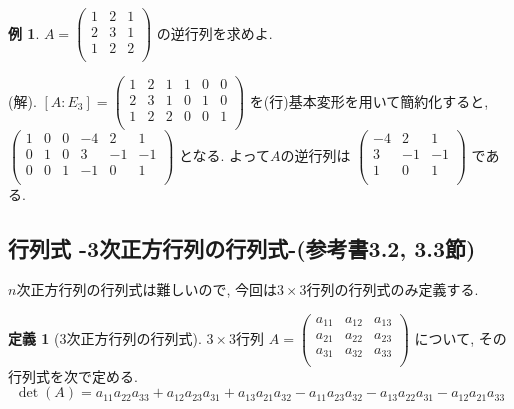 \documentclass[dvipdfmx,a4paper,11pt]{article}
\theoremstyle{definition}
\newtheorem{dfn}[thm]{定義}
\newtheorem{exa}[thm]{例}
\begin{document}
 \begin{exa}
 $
  A=\begin{pmatrix}
 1& 2&1 \\
 2& 3 & 1 \\
 1& 2 &  2 \\
 \end{pmatrix} 
 $
 の逆行列を求めよ.
 
 (解).
 $[A:E_3] = 
 \begin{pmatrix}
 1& 2&1  &1& 0&0 \\
 2& 3 & 1 &0& 1&0 \\
 1& 2 &  2 &0& 0&1 \\
 \end{pmatrix} 
 $
 を(行)基本変形を用いて簡約化すると, \\
 $
 \begin{pmatrix}
 1& 0&0  &-4& 2&1 \\
 0& 1 & 0 &3& -1&-1 \\
 0& 0&  1 &-1& 0&1 \\
 \end{pmatrix} 
 $
 となる. よって$A$の逆行列は
 $
 \begin{pmatrix}
-4& 2&1 \\
3& -1&-1\\
1& 0&1 \\
 \end{pmatrix} 
 $
 である.
 \end{exa}


 \subsection{行列式 -3次正方行列の行列式-(参考書3.2, 3.3節)}
 \label{subsec-7-2}
$n$次正方行列の行列式は難しいので, 今回は$3 \times 3$行列の行列式のみ定義する.

 \begin{tcolorbox}[
    colback = white,
    colframe = green!35!black,
    fonttitle = \bfseries,
    breakable = true]
    \begin{dfn}[3次正方行列の行列式]
$3 \times 3$行列
$A = 
  \begin{pmatrix}
a_{11}& a_{12} & a_{13}\\
a_{21}& a_{22} & a_{23}\\
a_{31}& a_{32} & a_{33}\\
 \end{pmatrix} 
$
について, その行列式を次で定める. 
$$
 \det(A)= 
 a_{11}a_{22}a_{33}+ a_{12}a_{23}a_{31}  +  a_{13}a_{21}a_{32} 
- a_{11}a_{23}a_{32}     - a_{13}a_{22}a_{31}  - a_{12}a_{21}a_{33}
$$
  \end{dfn}
 \end{tcolorbox}
\end{document}
